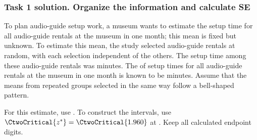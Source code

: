 \subsubsection*{Task 1 solution. Organize the information and calculate SE}
\label{sol:c2-advanced-a-a}
To plan audio-guide setup work, a museum wants to estimate the  setup time for all audio-guide rentals at the museum in one month; this mean is fixed but unknown. To estimate this mean, the study selected  audio-guide rentals at random, with each selection independent of the others. The  setup time among these  audio-guide rentals was  minutes. The  of setup times for all audio-guide rentals at the museum in one month is known to be  minutes. Assume that the means from repeated groups selected in the same way follow a bell-shaped pattern.

For this estimate, use  . To construct the intervals, use $\CtwoCritical{z^*}=\CtwoCritical{1.960}$ at . Keep all calculated endpoint digits.

